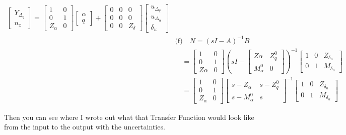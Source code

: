 \documentclass{article}
\begin{document}
\begin{align*}
\begin{bmatrix}
Y_{\Delta_q} \\
n_z
\end{bmatrix}
=
\begin{bmatrix}
1 & 0 \\
0 & 1 \\
Z_\alpha & 0
\end{bmatrix}
\begin{bmatrix}
\alpha \\
q
\end{bmatrix}
+
\begin{bmatrix}
0 & 0 & 0 \\
0 & 0 & 0 \\
0 & 0 & Z_\delta
\end{bmatrix}
\begin{bmatrix}
u_{\Delta_q} \\
u_{\Delta_\alpha} \\
\delta_u
\end{bmatrix} \\
&\text{(f)} \quad
N = (s I - A)^{-1} B \\
&\quad =
\begin{bmatrix}
1 & 0 \\
0 & 1 \\
Z\alpha & 0
\end{bmatrix}
(s I -
\begin{bmatrix}
Z\alpha & Z_q^0 \\
M_\alpha^0 & 0
\end{bmatrix})^{-1}
\begin{bmatrix}
1 & 0 & Z_{\delta_u} \\
0 & 1 & M_{\delta_u}
\end{bmatrix} \\
&\quad =
\begin{bmatrix}
1 & 0 \\
0 & 1 \\
Z_\alpha & 0
\end{bmatrix}
\begin{bmatrix}
s - Z_\alpha & s - Z_q^0 \\
s-M_\alpha^0 & s
\end{bmatrix}^{-1}
\begin{bmatrix}
1 & 0 & Z_{\delta_u} \\
0 & 1 & M_{\delta_u}
\end{bmatrix}
\end{align*}

Then you can see where I wrote out what that Transfer Function would look like from the input to the output with the uncertainties.
\end{document}
